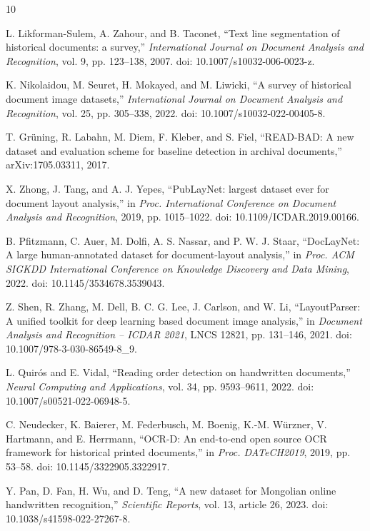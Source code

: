 \documentclass[pdflatex,sn-mathphys-num]{sn-jnl}
\begin{document}
\begin{thebibliography}{10}

L. Likforman-Sulem, A. Zahour, and B. Taconet, ``Text line segmentation of historical documents: a survey,'' \emph{International Journal on Document Analysis and Recognition}, vol. 9, pp. 123--138, 2007. doi: 10.1007/s10032-006-0023-z.

K. Nikolaidou, M. Seuret, H. Mokayed, and M. Liwicki, ``A survey of historical document image datasets,'' \emph{International Journal on Document Analysis and Recognition}, vol. 25, pp. 305--338, 2022. doi: 10.1007/s10032-022-00405-8.

T. Gr\"uning, R. Labahn, M. Diem, F. Kleber, and S. Fiel, ``READ-BAD: A new dataset and evaluation scheme for baseline detection in archival documents,'' arXiv:1705.03311, 2017.

X. Zhong, J. Tang, and A. J. Yepes, ``PubLayNet: largest dataset ever for document layout analysis,'' in \emph{Proc. International Conference on Document Analysis and Recognition}, 2019, pp. 1015--1022. doi: 10.1109/ICDAR.2019.00166.

B. Pfitzmann, C. Auer, M. Dolfi, A. S. Nassar, and P. W. J. Staar, ``DocLayNet: A large human-annotated dataset for document-layout analysis,'' in \emph{Proc. ACM SIGKDD International Conference on Knowledge Discovery and Data Mining}, 2022. doi: 10.1145/3534678.3539043.

Z. Shen, R. Zhang, M. Dell, B. C. G. Lee, J. Carlson, and W. Li, ``LayoutParser: A unified toolkit for deep learning based document image analysis,'' in \emph{Document Analysis and Recognition -- ICDAR 2021}, LNCS 12821, pp. 131--146, 2021. doi: 10.1007/978-3-030-86549-8\_9.

L. Quir\'os and E. Vidal, ``Reading order detection on handwritten documents,'' \emph{Neural Computing and Applications}, vol. 34, pp. 9593--9611, 2022. doi: 10.1007/s00521-022-06948-5.

C. Neudecker, K. Baierer, M. Federbusch, M. Boenig, K.-M. W\"urzner, V. Hartmann, and E. Herrmann, ``OCR-D: An end-to-end open source OCR framework for historical printed documents,'' in \emph{Proc. DATeCH2019}, 2019, pp. 53--58. doi: 10.1145/3322905.3322917.


Y. Pan, D. Fan, H. Wu, and D. Teng, ``A new dataset for Mongolian online handwritten recognition,'' \emph{Scientific Reports}, vol. 13, article 26, 2023. doi: 10.1038/s41598-022-27267-8.


\end{thebibliography}
\end{document}
